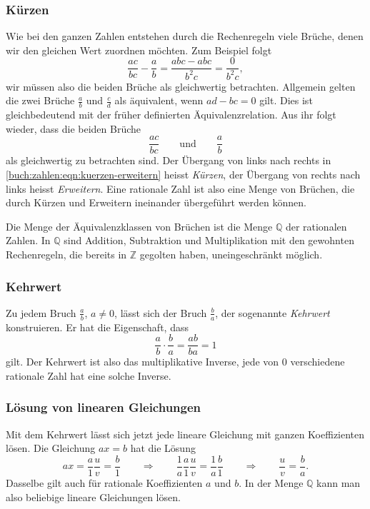 \subsubsection{Kürzen}
Wie bei den ganzen Zahlen entstehen durch die Rechenregeln viele Brüche,
denen wir den gleichen Wert zuordnen möchten.
Zum Beispiel folgt
\[
\frac{ac}{bc} - \frac{a}{b} 
=
\frac{abc-abc}{b^2c}
=
\frac{0}{b^2c},
\]
wir müssen also die beiden Brüche als gleichwertig betrachten.
Allgemein gelten die zwei Brüche $\frac{a}{b}$ und $\frac{c}{d}$
als äquivalent, wenn $ad-bc= 0$ gilt.
Dies ist gleichbedeutend mit der früher definierten Äquivalenzrelation.
Aus ihr folgt wieder, dass die beiden Brüche
\begin{equation}
\frac{ac}{bc} 
\qquad\text{und}\qquad
\frac{a}{b}
\label{buch:zahlen:eqn:kuerzen-erweitern}
\end{equation}
als gleichwertig zu betrachten sind.
Der Übergang von links nach rechts in \eqref{buch:zahlen:eqn:kuerzen-erweitern}
heisst {\em Kürzen},
%
der Übergang von rechts nach links heisst {\em Erweitern}.
%
Eine rationale Zahl ist also eine Menge von Brüchen, die durch
Kürzen und Erweitern ineinander übergeführt werden können.

Die Menge der Äquivalenzklassen von Brüchen ist die Menge $\mathbb{Q}$
der rationalen Zahlen.
%
In $\mathbb{Q}$ sind Addition, Subtraktion und Multiplikation mit den
gewohnten Rechenregeln, die bereits in $\mathbb{Z}$ gegolten haben,
uneingeschränkt möglich.

\subsubsection{Kehrwert}
Zu jedem Bruch $\frac{a}{b}$, $a\ne 0$, lässt sich der Bruch $\frac{b}{a}$,
der sogenannte {\em Kehrwert}
%
konstruieren.
Er hat die Eigenschaft, dass
\[
\frac{a}{b}\cdot\frac{b}{a}
=
\frac{ab}{ba}
=
1
\]
gilt.
Der Kehrwert ist also das multiplikative Inverse, jede von $0$ verschiedene
rationale Zahl hat eine solche Inverse.

\subsubsection{Lösung von linearen Gleichungen}
Mit dem Kehrwert lässt sich jetzt jede lineare Gleichung mit ganzen
Koeffizienten lösen.
%
Die Gleichung $ax=b$ hat die Lösung
\[
ax = \frac{a}{1} \frac{u}{v} = \frac{b}{1}
\qquad\Rightarrow\qquad
\frac{1}{a}
 \frac{a}{1} \frac{u}{v} = \frac{1}{a}\frac{b}{1} 
\qquad\Rightarrow\qquad
\frac{u}{v} = \frac{b}{a}.
\]
Dasselbe gilt auch für rationale Koeffizienten $a$ und $b$.
In der Menge $\mathbb{Q}$ kann man also beliebige lineare Gleichungen
lösen.


